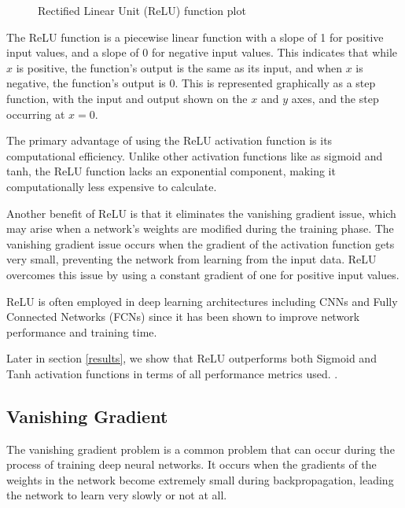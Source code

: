 \documentclass[a4paper]{article}
\begin{document}
\begin{figure}[!h]
\centering
{}
\caption{Rectified Linear Unit (ReLU) function plot}
\end{figure}

The ReLU function is a piecewise linear function with a slope of 1 for positive input
values, and a slope of 0 for negative input values. This indicates that while $x$ is positive, the function's output is the same as its input, and when $x$ is negative, the function's output is 0. This is represented graphically as a step function, with the input and output shown on the $x$ and $y$ axes, and the step occurring at $x = 0$. 

The primary advantage of using the ReLU activation function is its computational efficiency. Unlike other activation functions like as sigmoid and tanh, the ReLU function lacks an exponential component, making it computationally less expensive to calculate. 

Another benefit of ReLU is that it eliminates the vanishing gradient issue, which may arise when a network's weights are modified during the training phase. The vanishing gradient issue occurs when the gradient of the activation function gets very small, preventing the network from learning from the input data. ReLU overcomes this issue by using a constant gradient of one for positive input values. 

ReLU is often employed in deep learning architectures including CNNs and Fully Connected Networks (FCNs) since it has been shown to improve network performance and training time.

Later in section \ref{results}, we show that ReLU outperforms both Sigmoid and Tanh activation functions in terms of all performance metrics used.
.
\subsection{Vanishing Gradient} \label{gradient}
The vanishing gradient problem is a common problem that can occur during the process of training deep neural networks. It occurs when the gradients of the weights in the network become extremely small during backpropagation, leading the network to learn very slowly or not at all.
\end{document}
